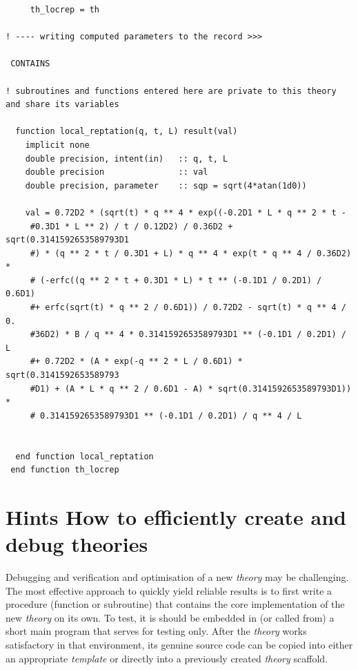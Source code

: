 \documentclass[11pt,fleqn]{book} %
\newcommand{\desc}[1]{\hskip 0.5cm {\color{descgray} #1}}
\begin{document}
\begin{verbatim}
     th_locrep = th
 
! ---- writing computed parameters to the record >>>  
 
 CONTAINS 
 
! subroutines and functions entered here are private to this theory and share its variables 
 
  function local_reptation(q, t, L) result(val)
    implicit none
    double precision, intent(in)   :: q, t, L
    double precision               :: val
    double precision, parameter    :: sqp = sqrt(4*atan(1d0))

    val = 0.72D2 * (sqrt(t) * q ** 4 * exp((-0.2D1 * L * q ** 2 * t -
     #0.3D1 * L ** 2) / t / 0.12D2) / 0.36D2 + sqrt(0.3141592653589793D1
     #) * (q ** 2 * t / 0.3D1 + L) * q ** 4 * exp(t * q ** 4 / 0.36D2) *
     # (-erfc((q ** 2 * t + 0.3D1 * L) * t ** (-0.1D1 / 0.2D1) / 0.6D1)
     #+ erfc(sqrt(t) * q ** 2 / 0.6D1)) / 0.72D2 - sqrt(t) * q ** 4 / 0.
     #36D2) * B / q ** 4 * 0.3141592653589793D1 ** (-0.1D1 / 0.2D1) / L
     #+ 0.72D2 * (A * exp(-q ** 2 * L / 0.6D1) * sqrt(0.3141592653589793
     #D1) + (A * L * q ** 2 / 0.6D1 - A) * sqrt(0.3141592653589793D1)) *
     # 0.3141592653589793D1 ** (-0.1D1 / 0.2D1) / q ** 4 / L


  end function local_reptation
 end function th_locrep
\end{verbatim}
\normalsize

\section{Hints \desc{How to efficiently create and debug theories}}
Debugging and verification and optimisation of a new \emph{theory} may be challenging.
The most effective approach to quickly yield reliable results is to first write
a procedure (function or subroutine) that contains the core implementation of the new
\emph{theory} on its own. To test, it is should be embedded in (or called from) a
short main program that serves for testing only.
After the \emph{theory} works satisfactory in that environment, its genuine source code
can be copied into either an appropriate \emph{template} or directly into a previously
created \emph{theory} scaffold.
 
\end{document}

